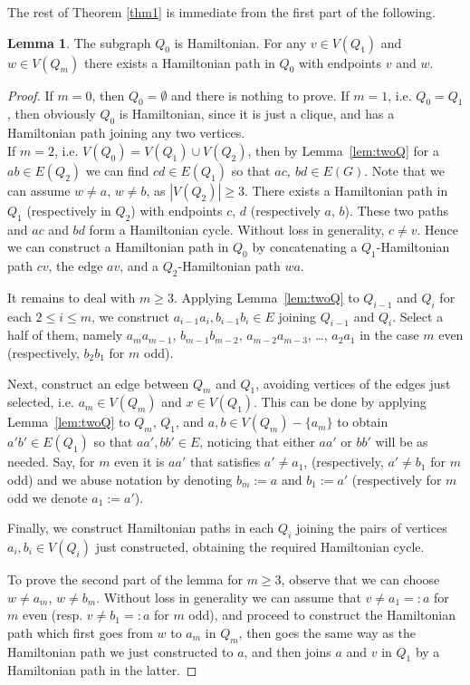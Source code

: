 \documentclass{amsart}
\theoremstyle{definition}
\newtheorem{lemma}{Lemma}
\begin{document}
The rest of Theorem \ref{thm1} is immediate from the first part of the following.
\begin{lemma}\label{lem:Q0H}
The subgraph $Q_0$ is Hamiltonian. 
For any $v\in V(Q_1)$ and $w\in V(Q_m)$ there exists a Hamiltonian
path in $Q_0$ with endpoints $v$ and $w$.
\end{lemma} 
\begin{proof}
If $m=0$, then $Q_0=\emptyset$ and there is nothing to prove.
If $m=1$, i.e. $Q_0=Q_1$, then obviously $Q_0$ is Hamiltonian, since it is just a clique, and
has a Hamiltonian path joining any two vertices.\\
If $m=2$, i.e. $V(Q_0)=V(Q_1)\cup V(Q_2)$, then by Lemma~\ref{lem:twoQ} 
for a $ab\in E(Q_2)$
we can find $cd\in E(Q_1)$ so that $ac,~bd\in E(G)$. 
Note that we can assume $w\neq a$, $w\neq b$, as $|V(Q_2)|\geq 3$.
There exists a Hamiltonian path in  $Q_1$ (respectively in $Q_2$) 
with endpoints $c$, $d$ (respectively $a$, $b$).
These two paths and $ac$ and $bd$ form a Hamiltonian cycle.
Without loss in generality, $c\neq v$. Hence we can construct a
Hamiltonian path in $Q_0$ by concatenating a $Q_1$-Hamiltonian
path $cv$, the  edge $av$, and a $Q_2$-Hamiltonian path $wa$.
 
It remains to deal with $m\geq 3$.
Applying Lemma~\ref{lem:twoQ} to $Q_{i-1}$ and $Q_i$ for each $2\leq i\leq m$, 
we construct $a_{i-1}a_i, b_{i-1}b_i\in E$ joining $Q_{i-1}$ and $Q_i$.
Select a half of them, namely $a_{m}a_{m-1}$, $b_{m-1}b_{m-2}$, $a_{m-2}a_{m-3}$, \dots,
$a_2a_1$ in the case $m$ even (respectively, $b_2b_1$ for $m$ odd).

Next, construct an edge between $Q_m$ and $Q_1$, avoiding vertices of the edges just
selected, i.e. $a_m\in V(Q_m)$ and $x\in V(Q_1)$. 
This can be done by applying Lemma~\ref{lem:twoQ} to $Q_m$, $Q_1$, 
and $a,b\in V(Q_m)-\{a_m\}$ to obtain $a'b'\in E(Q_1)$ so that $aa',bb'\in E$, 
noticing that either $aa'$ or $bb'$ will be as needed. Say, for $m$ even 
it is $aa'$
that satisfies $a'\neq a_1$, (respectively, $a'\neq b_1$ for $m$ odd)  and we 
abuse notation by denoting $b_m:=a$ and $b_1:=a'$ (respectively for $m$ odd 
we denote $a_1:=a'$).

Finally, we construct Hamiltonian paths in each $Q_i$ joining the pairs of vertices
$a_i,b_i\in V(Q_i)$ just constructed, obtaining the required Hamiltonian cycle.

To prove the second part of the lemma for $m\geq 3$, observe that we can choose
$w\neq a_m$, $w\neq b_m$. Without loss in generality we can assume that $v\neq a_1=:a$ 
for $m$ even (resp. $v\neq b_1=:a$ for $m$ odd), 
and proceed to construct the Hamiltonian path
which first goes from $w$ to $a_m$ in $Q_m$, then goes the same way as the Hamiltonian
path we just constructed to $a$, and then joins $a$ and $v$ in $Q_1$ by a Hamiltonian path 
in the latter.
\end{proof}
\end{document}
